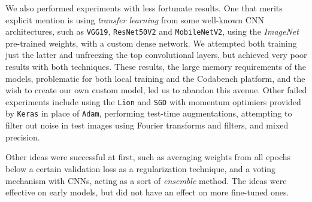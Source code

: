 \documentclass[11pt]{article}
\begin{document}
\begin{multicols}{2}
      We also performed experiments with less fortunate results. One that merits explicit mention is using \textit{transfer learning}\cite{TransferLearning} from some well-known CNN architectures, such as \texttt{VGG19}, \texttt{ResNet50V2} and \texttt{MobileNetV2}, using the \textit{ImageNet}\cite{ImageNet} pre-trained weights, with a custom dense network. We attempted both training just the latter and unfreezing the top convolutional layers, but achieved very poor results with both techniques. These results, the large memory requirements of the models, problematic for both local training and the Codabench platform, and the wish to create our own custom model, led us to abandon this avenue. Other failed experiments include using the \texttt{Lion} and \texttt{SGD} with momentum optimiers provided by \texttt{Keras} in place of \texttt{Adam}, performing test-time augmentations, attempting to filter out noise in test images using Fourier transforms and filters, and mixed precision.

      Other ideas were successful at first, such as averaging weights from all epochs below a certain validation loss as a regularization technique, and a voting mechanism with CNNs, acting as a sort of \textit{ensemble} method. The ideas were effective on early models, but did not have an effect on more fine-tuned ones.




\end{multicols}
\end{document}
